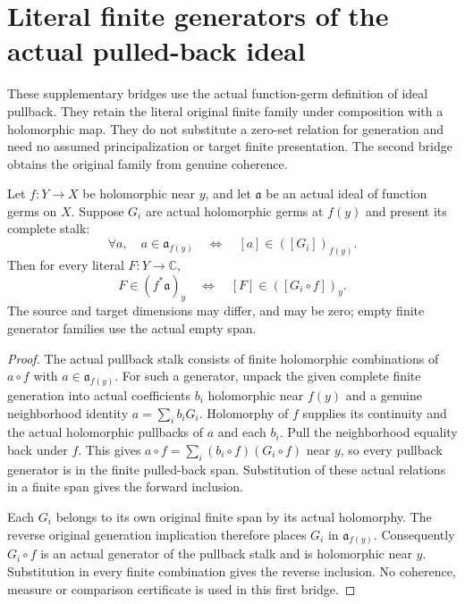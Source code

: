 \section{Literal finite generators of the actual pulled-back ideal}

These supplementary bridges use the actual function-germ definition of
ideal pullback. They retain the literal original finite family under
composition with a holomorphic map. They do not substitute a zero-set
relation for generation and need no assumed principalization or target
finite presentation. The second bridge obtains the original family
from genuine coherence.

\begin{theorem}
\label{trace:actual-finite-germ-ideal-pullback-generation}
\leanok
Let $f:Y\to X$ be holomorphic near $y$, and let $\mathfrak a$ be an
actual ideal of function germs on $X$. Suppose $G_i$ are actual
holomorphic germs at $f(y)$ and present its complete stalk:
\[
 \forall a,\quad a\in\mathfrak a_{f(y)}
 \quad\Longleftrightarrow\quad [a]\in([G_i])_{f(y)}.
\]
Then for every literal $F:Y\to\mathbb C$,
\[
 F\in(f^*\mathfrak a)_y
 \quad\Longleftrightarrow\quad [F]\in([G_i\circ f])_y.
\]
The source and target dimensions may differ, and may be zero; empty
finite generator families use the actual empty span.
\end{theorem}
\begin{proof}
The actual pullback stalk consists of finite holomorphic combinations
of $a\circ f$ with $a\in\mathfrak a_{f(y)}$. For such a generator,
unpack the given complete finite generation into actual coefficients
$b_i$ holomorphic near $f(y)$ and a genuine neighborhood identity
$a=\sum_i b_iG_i$. Holomorphy of $f$ supplies its continuity and the
actual holomorphic pullbacks of $a$ and each $b_i$. Pull the
neighborhood equality back under $f$. This gives
$a\circ f=\sum_i(b_i\circ f)(G_i\circ f)$ near $y$, so every
pullback generator is in the finite pulled-back span. Substitution
of these actual relations in a finite span gives the forward inclusion.

Each $G_i$ belongs to its own original finite span by its actual
holomorphy. The reverse original generation implication therefore
places $G_i$ in $\mathfrak a_{f(y)}$. Consequently $G_i\circ f$ is
an actual generator of the pullback stalk and is holomorphic near
$y$. Substitution in every finite combination gives the reverse
inclusion. No coherence, measure or comparison certificate is used
in this first bridge.
\end{proof}

